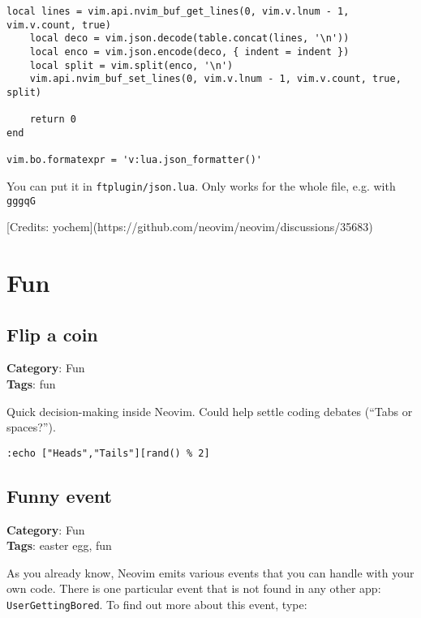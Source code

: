 {{{{{\begin{Exa*}{}
\begin{Verbatim}[fontsize=\footnotesize, breaklines, breakanywhere]
	local lines = vim.api.nvim_buf_get_lines(0, vim.v.lnum - 1, vim.v.count, true)
	local deco = vim.json.decode(table.concat(lines, '\n'))
	local enco = vim.json.encode(deco, { indent = indent })
	local split = vim.split(enco, '\n')
	vim.api.nvim_buf_set_lines(0, vim.v.lnum - 1, vim.v.count, true, split)

	return 0
end

vim.bo.formatexpr = 'v:lua.json_formatter()'
\end{Verbatim}
\end{Exa*}

You can put it in {\footnotesize \Verb§ftplugin/json.lua§}. Only works for the whole file, e.g. with {\footnotesize \Verb§gggqG§}

[Credits: yochem](https://github.com/neovim/neovim/discussions/35683)

\chapter{Fun}
\section{Flip a coin}

\textbf{Category}: Fun\\ \textbf{Tags}: fun
\vspace{0.5cm}

Quick decision-making inside Neovim. Could help settle coding debates (“Tabs or spaces?”).

\begin{Exa*}{}
\begin{Verbatim}[fontsize=\footnotesize, breaklines, breakanywhere]
:echo ["Heads","Tails"][rand() % 2]
\end{Verbatim}
\end{Exa*}

\section{Funny event}

\textbf{Category}: Fun\\ \textbf{Tags}: easter egg, fun
\vspace{0.5cm}

As you already know, Neovim emits various events that you can handle with your own code. There is one particular event that is not found in any other app: {\footnotesize \Verb§UserGettingBored§}. To find out more about this event, type:

}}}}}
